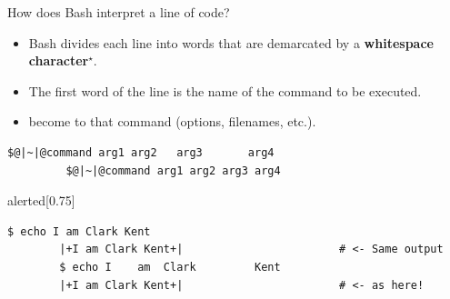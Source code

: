 
\begin{frame}[fragile]{How does Bash interpret a line of code?}
    \begin{itemize}
        \item Bash divides each line into words that are demarcated by a \textbf{whitespace character}$^\star$.
        \item \alert{The first word} of the line is the name of \alert{the command} to be executed.
        \item {} become  to that command (options, filenames, etc.).
    \end{itemize}
    \begin{lstlisting}[style=MyBash, showspaces=true, aboveskip=3mm]
         $@|~|@command arg1 arg2   arg3       arg4
         $@|~|@command arg1 arg2 arg3 arg4
    \end{lstlisting}
    \vspace{3mm}
    \begin{varblock}{alerted}[0.75\textwidth]{}
    \end{varblock}
    \begin{lstlisting}[style=MyBash, aboveskip=3mm]
        $ echo I am Clark Kent
        |+I am Clark Kent+|                        # <- Same output
        $ echo I    am  Clark         Kent
        |+I am Clark Kent+|                        # <- as here!
    \end{lstlisting}
\end{frame}
